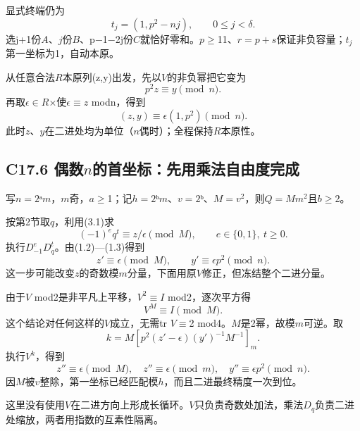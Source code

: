 \documentclass[11pt,a4paper]{article}
\theoremstyle{definition}
\numberwithin{equation}{section}
\begin{document}
{显式终端仍为} \[
t_j=(1,p^2-nj),\qquad0\le j<\delta.
\] {选j+1份\ensuremath{A}、\ensuremath{j}份\ensuremath{B}、p−1−2j份\ensuremath{C}就恰好零和。\ensuremath{p}\ensuremath{\ge}11、\ensuremath{r=p+s}保证非负容量；\ensuremath{t_{j}}第一坐标为1，自动本原。}

{从任意合法\ensuremath{R}本原列(z,y)出发，先以\ensuremath{V}的非负幂把它变为} \[
p^2z\equiv y\pmod n.
\] {再取\ensuremath{\epsilon }\ensuremath{\in}\ensuremath{R}×使\ensuremath{\epsilon }\ensuremath{\equiv}\ensuremath{z}} {modn，得到} \[
(z,y)\equiv\epsilon(1,p^2)\pmod n.
\tag{C17.5.1}
\] {此时\ensuremath{z}、\ensuremath{y}在二进处均为单位（\ensuremath{n}偶时）；全程保持\ensuremath{R}本原性。}

\subsection*{\texorpdfstring{{C17.6} {偶数\ensuremath{n}的首坐标：先用乘法自由度完成}}{C17.6 偶数的首坐标：先用乘法自由度完成}}\label{C17-h128}

{写\ensuremath{n=2}ᵃ\ensuremath{m}，\ensuremath{m}奇，\ensuremath{a}\ensuremath{\ge}1；记\ensuremath{h=2}ᵇ\ensuremath{m}、\ensuremath{v=2}ᵇ、\ensuremath{M=v^{2}}，则\ensuremath{Q=Mm^{2}}且\ensuremath{b}\ensuremath{\ge}2。}

{按第2节取\ensuremath{q}，利用(3.1)求} \[
(-1)^e q^t\equiv z/\epsilon\pmod M,
\qquad e\in\{0,1\},\ t\ge0.
\] {执行\ensuremath{D_{-1}^{e}D_{q}^{t}}。由(1.2)---(1.3)得到} \[
z'\equiv\epsilon\pmod M,\qquad y'\equiv\epsilon p^2\pmod n.
\tag{C17.6.1}
\] {这一步可能改变\ensuremath{z}的奇数模\ensuremath{m}分量，下面用原\ensuremath{V}修正，但冻结整个二进分量。}

{由于\ensuremath{V}} {mod2是非平凡上平移，\ensuremath{V^{2}}\ensuremath{\equiv}\ensuremath{I}} {mod2，逐次平方得} \[
\boxed{V^M\equiv I\pmod M.}
\tag{C17.6.2}
\] {这个结论对任何这样的\ensuremath{V}成立，无需tr} {\ensuremath{V}\ensuremath{\equiv}2} {mod4。\ensuremath{M}是2幂，故模\ensuremath{m}可逆。取} \[
k=M\left[p^2(z'-\epsilon)(y')^{-1}M^{-1}\right]_m.
\] {执行\ensuremath{V^{k}}，得到} \[
\boxed{z''\equiv\epsilon\pmod M,\quad
z''\equiv\epsilon\pmod m,\quad
y''\equiv\epsilon p^2\pmod n.}
\tag{C17.6.3}
\] {因\ensuremath{M}被\ensuremath{v}整除，第一坐标已经匹配模\ensuremath{h}，而且二进最终精度一次到位。}

{这里没有使用\ensuremath{V}在二进方向上形成长循环。\ensuremath{V}只负责奇数处加法，乘法\ensuremath{D_{q}}负责二进处缩放，两者用指数的互素性隔离。}
\end{document}

